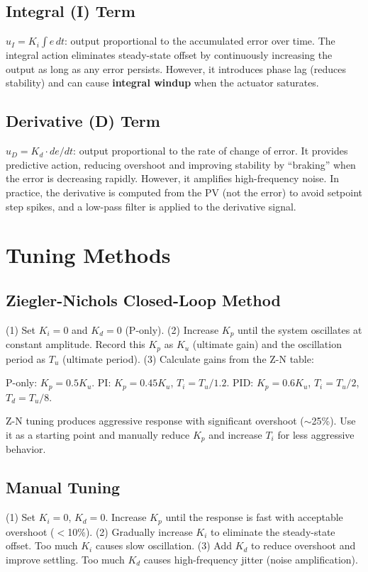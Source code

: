 \documentclass[11pt,letterpaper,twoside,openany]{book}
\begin{document}
\subsection{Integral (I) Term}
$u_I = K_i \int e\,dt$: output proportional to the accumulated error over time. The integral action eliminates steady-state offset by continuously increasing the output as long as any error persists. However, it introduces phase lag (reduces stability) and can cause \textbf{integral windup} when the actuator saturates.

\subsection{Derivative (D) Term}
$u_D = K_d \cdot de/dt$: output proportional to the rate of change of error. It provides predictive action, reducing overshoot and improving stability by ``braking'' when the error is decreasing rapidly. However, it amplifies high-frequency noise. In practice, the derivative is computed from the PV (not the error) to avoid setpoint step spikes, and a low-pass filter is applied to the derivative signal.

\section{Tuning Methods}
\subsection{Ziegler-Nichols Closed-Loop Method}
(1) Set $K_i = 0$ and $K_d = 0$ (P-only). (2) Increase $K_p$ until the system oscillates at constant amplitude. Record this $K_p$ as $K_u$ (ultimate gain) and the oscillation period as $T_u$ (ultimate period). (3) Calculate gains from the Z-N table:

P-only: $K_p = 0.5 K_u$. PI: $K_p = 0.45 K_u$, $T_i = T_u/1.2$. PID: $K_p = 0.6 K_u$, $T_i = T_u/2$, $T_d = T_u/8$.

Z-N tuning produces aggressive response with significant overshoot ($\sim$25\%). Use it as a starting point and manually reduce $K_p$ and increase $T_i$ for less aggressive behavior.

\subsection{Manual Tuning}
(1) Set $K_i = 0$, $K_d = 0$. Increase $K_p$ until the response is fast with acceptable overshoot ($<$10\%). (2) Gradually increase $K_i$ to eliminate the steady-state offset. Too much $K_i$ causes slow oscillation. (3) Add $K_d$ to reduce overshoot and improve settling. Too much $K_d$ causes high-frequency jitter (noise amplification).
\end{document}
